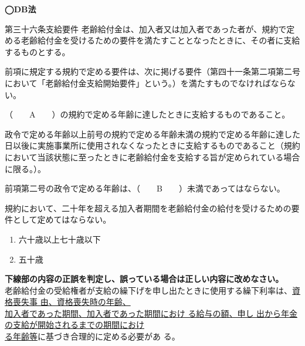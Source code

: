 \begin{fillblank}[年金1 2020 問題1(1)A、年金1 2019 問題1(1)BC]
  \noindent \textbf{◯DB法}
  \begin{lawstructure}
    \begin{lawarticle}{第三十六条}{支給要件}
      老齢給付金は、加入者又は加入者であった者が、規約で定める老齢給付金を受けるための要件を満たすこととなったときに、その者に支給するものとする。

      前項に規定する規約で定める要件は、次に掲げる要件（第四十一条第二項第二号において「老齢給付金支給開始要件」という。）を満たすものでなければならない。

      （　　A　　）の規約で定める年齢に達したときに支給するものであること。
      
      政令で定める年齢以上前号の規約で定める年齢未満の規約で定める年齢に達した日以後に実施事業所に使用されなくなったときに支給するものであること（規約において当該状態に至ったときに老齢給付金を支給する旨が定められている場合に限る。）。
    
      前項第二号の政令で定める年齢は、（　　B　　）未満であってはならない。

      規約において、二十年を超える加入者期間を老齢給付金の給付を受けるための要件として定めてはならない。
    \end{lawarticle}
  \end{lawstructure}  
\end{fillblank}

\begin{answerbox}
  \begin{enumerate}[A:]
    \item 六十歳以上七十歳以下
    \item 五十歳
  \end{enumerate}
\end{answerbox}

\begin{truefalse}[年金1 2022 問題1(3)ア]
      \textbf{下線部の内容の正誤を判定し、誤っている場合は正しい内容に改めなさい。}
  \\

  老齢給付金の受給権者が支給の繰下げを申し出たときに使用する繰下利率は、\underline{資格喪失事
由、資格喪失時の年齢、}\\
\underline{加入者であった期間、加入者であった期間におけ
る給与の額、申し
出から年金の支給が開始されるまでの期間におけ}\\
\underline{る年齢等}に基づき合理的に定める必要があ
る。
\end{truefalse}

